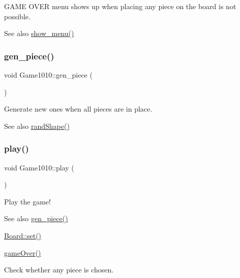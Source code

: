 G\+A\+ME O\+V\+ER menu shows up when placing any piece on the board is not possible. 

\begin{DoxySeeAlso}{See also}
\mbox{\hyperlink{class_game1010_a99d6f53c3073861fe37ef67caa073840}{show\+\_\+menu()}} 
\end{DoxySeeAlso}
\mbox{\label{class_game1010_a9576170947a355682c922cb648432b9e}} 
\subsubsection{\texorpdfstring{gen\+\_\+piece()}{gen\_piece()}}
{\footnotesize\ttfamily void Game1010\+::gen\+\_\+piece (\begin{DoxyParamCaption}{ }\end{DoxyParamCaption})\hspace{0.3cm}{\ttfamily [inline]}}



Generate new ones when all pieces are in place. 

\begin{DoxySeeAlso}{See also}
\mbox{\hyperlink{class_game1010_ae4c1d03b230aafd1c77e038e1e43c272}{rand\+Shape()}} 
\end{DoxySeeAlso}
\mbox{\label{class_game1010_afa18a3a81b8966417a228459a5bebf53}} 
\subsubsection{\texorpdfstring{play()}{play()}}
{\footnotesize\ttfamily void Game1010\+::play (\begin{DoxyParamCaption}{ }\end{DoxyParamCaption})\hspace{0.3cm}{\ttfamily [inline]}}



Play the game! 

\begin{DoxySeeAlso}{See also}
\mbox{\hyperlink{class_game1010_a9576170947a355682c922cb648432b9e}{gen\+\_\+piece()}} 

\mbox{\hyperlink{class_board_a4e818e1e582bd7018353698cd2219dfd}{Board\+::set()}} 

\mbox{\hyperlink{class_game1010_a3bc296b7ba6bffeda3baceb1240190b6}{game\+Over()}} 
\end{DoxySeeAlso}
Check whether any piece is chosen.

